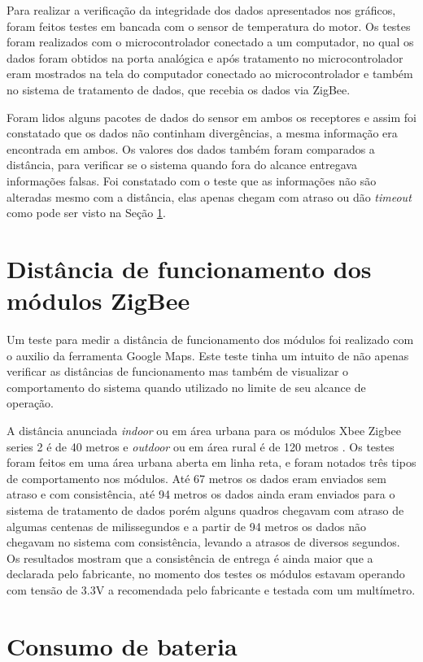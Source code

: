 Para realizar a verificação da integridade dos dados apresentados nos gráficos, foram feitos testes em bancada com o sensor de temperatura do motor. Os testes foram realizados com o microcontrolador conectado a um computador, no qual os dados foram obtidos na porta analógica e após tratamento no microcontrolador eram mostrados na tela do computador conectado ao microcontrolador e também no sistema de tratamento de dados, que recebia os dados via ZigBee. 

Foram lidos alguns pacotes de dados do sensor em ambos os receptores e assim foi constatado que os dados não continham divergências, a mesma informação era encontrada em ambos. Os valores dos dados também foram comparados a distância, para verificar se o sistema quando fora do alcance entregava informações falsas. Foi constatado com o teste que as informações não são alteradas mesmo com a distância, elas apenas chegam com atraso ou dão \textit{timeout} como pode ser visto na Seção \ref{sec:distancia}.

\section{Distância de funcionamento dos módulos ZigBee}
\label{sec:distancia}

Um teste para medir a distância de funcionamento dos módulos foi realizado com o auxilio da ferramenta Google Maps. Este teste tinha um intuito de não apenas verificar as distâncias de funcionamento mas também de visualizar o comportamento do sistema quando utilizado no limite de seu alcance de operação. 

A distância anunciada \textit{indoor} ou em área urbana para os módulos Xbee Zigbee series 2 é de 40 metros e \textit{outdoor} ou em área rural é de 120 metros \cite{xbeeuserguide}. Os testes foram feitos em uma área urbana aberta em linha reta, e foram notados três tipos de comportamento nos módulos. Até 67 metros os dados eram enviados sem atraso e com consistência, até 94 metros os dados ainda eram enviados para o sistema de tratamento de dados porém alguns quadros chegavam com atraso de algumas centenas de milissegundos e a partir de 94 metros os dados não chegavam no sistema com consistência, levando a atrasos de diversos segundos. Os resultados mostram que a consistência de entrega é ainda maior que a declarada pelo fabricante, no momento dos testes os módulos estavam operando com tensão de 3.3V a recomendada pelo fabricante e testada com um multímetro. 

\section{Consumo de bateria}

